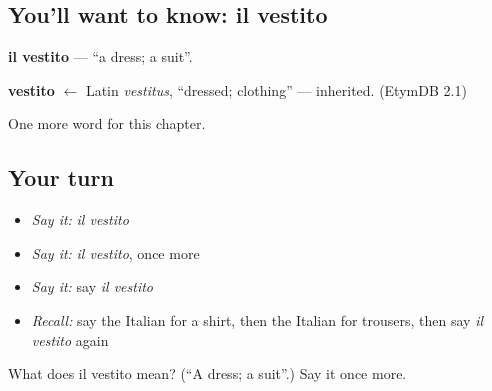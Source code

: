 \subsection*{You'll want to know: il vestito}
\textbf{il vestito} — \textquotedblleft{}a dress; a suit\textquotedblright{}.

\begin{cousinweb}
\textbf{vestito} $\leftarrow$ Latin \emph{vestitus}, \textquotedblleft{}dressed; clothing\textquotedblright{} — inherited. (EtymDB 2.1)
\end{cousinweb}

\begin{grammarlens}[title={What you've built}]
One more word for this chapter.
\end{grammarlens}

\subsection*{Your turn}
\begin{itemize}
\raggedright
  \item \emph{Say it:} \emph{il vestito}
  \item \emph{Say it:} \emph{il vestito}, once more
  \item \emph{Say it:} say \emph{il vestito}
  \item \emph{Recall:} say the Italian for a shirt, then the Italian for trousers, then say \emph{il vestito} again
\end{itemize}

\begin{tcolorbox}[breakable,colback=teal!4,colframe=teal!35!black,title={Before you move on}]
What does il vestito mean? (\textquotedblleft{}A dress; a suit\textquotedblright{}.) Say it once more.
\end{tcolorbox}
